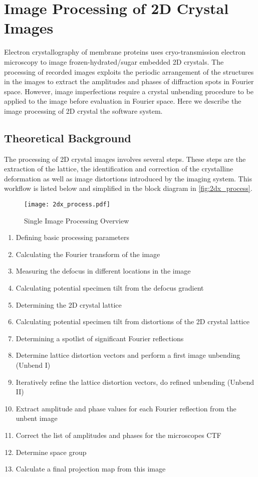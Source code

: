 \section{Image Processing of 2D Crystal Images}
\label{sec:single_image_processing}

Electron crystallography of membrane proteins uses cryo-transmission electron microscopy to image frozen-hydrated/sugar embedded 2D crystals. The processing of recorded images exploits the periodic arrangement of the structures in the images to extract the amplitudes and phases of diffraction spots in Fourier space. However, image imperfections require a crystal unbending procedure to be applied to the image before evaluation in Fourier space. Here we describe the image processing of 2D crystal the {\twodx} software system. 

\subsection{Theoretical Background}
\label{sec:2d_background}

The processing of 2D crystal images involves several steps. These steps are the extraction of the lattice, the identification and correction of the crystalline deformation as well as image distortions introduced by the imaging system. This workflow is listed below and simplified in the block diagram in \autoref{fig:2dx_process}.

\begin{figure}[H]
	\centering
	\texttt{[image: 2dx\_process.pdf]}
	\caption{Single Image Processing Overview}
	\label{fig:2dx_process}
\end{figure}


\begin{enumerate}
	\item Defining basic processing parameters
	\item Calculating the Fourier transform of the image
	\item Measuring the defocus in different locations in the image
	\item Calculating potential specimen tilt from the defocus gradient
	\item Determining the 2D crystal lattice
	\item Calculating potential specimen tilt from distortions of the 2D crystal lattice
	\item Determining a spotlist of significant Fourier reflections
	\item Determine lattice distortion vectors and perform a first image unbending (Unbend I)
	\item Iteratively refine the lattice distortion vectors, do refined unbending (Unbend II)
	\item Extract amplitude and phase values for each Fourier reflection from the unbent image
	\item Correct the list of amplitudes and phases for the microscopes CTF
	\item Determine space group
	\item Calculate a final projection map from this image
\end{enumerate}

